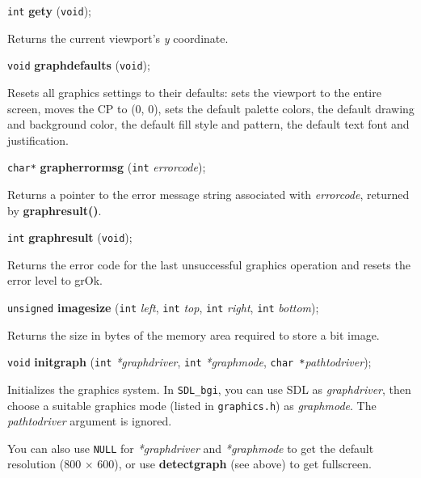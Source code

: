 \documentclass[a4paper,11pt]{article}
\newcommand{\SDLbgi}{\texttt{SDL\_bgi}}
\newcommand{\V}{\texttt{void}}      %
\newcommand{\I}{\texttt{int}}       %
\newcommand{\C}{\texttt{char *}}    %
\newcommand{\func}[1]{\textbf{#1}}  %
\newcommand{\A}[1]{\emph{#1}}       %
\newcommand{\F}[1]{\texttt{#1}}     %
\newcommand{\T}[1]{\texttt{#1}}     %
\newenvironment{bgi}
{ %
  \begin{snugshade}
}
{ %
  \end{snugshade}
}
\begin{document}

\begin{bgi}
\I{} \func{gety} (\V{});
\end{bgi}

Returns the current viewport's \A{y} coordinate.


\begin{bgi}
\V{} \func{graphdefaults} (\V{});
\end{bgi}

Resets all graphics settings to their defaults: sets the viewport to
the entire screen, moves the CP to (0, 0), sets the default palette
colors, the default drawing and background color, the default fill
style and pattern, the default text font and justification.


\begin{bgi}
\texttt{char*} \func{grapherrormsg} (\I{} \A{errorcode});
\end{bgi}

Returns a pointer to the error message string associated with
\A{errorcode}, returned by \func{graphresult()}.


\begin{bgi}
\I{} \func{graphresult} (\V{});
\end{bgi}

Returns the error code for the last unsuccessful graphics operation
and resets the error level to grOk.


\begin{bgi}
\texttt{unsigned} \func{imagesize} (\I{} \A{left}, \I{} \A{top}, \I{}
\A{right}, \I{} \A{bottom});
\end{bgi}

Returns the size in bytes of the memory area required to store a bit
image.


\begin{bgi}
\V{} \func{initgraph} (\I{} \A{*graphdriver}, \I{} \A{*graphmode},
\C{}\A{pathtodriver});
\end{bgi}

Initializes the graphics system. In \SDLbgi, you can use SDL as
\A{graphdriver}, then choose a suitable graphics mode (listed in
\F{graphics.h}) as \A{graphmode}. The \A{pathtodriver} argument is
ignored.

You can also use \T{NULL} for \A{*graphdriver} and \A{*graphmode} to
get the default resolution (800 $\times$ 600), or use
\func{detectgraph} (see above) to get fullscreen.
\end{document}
